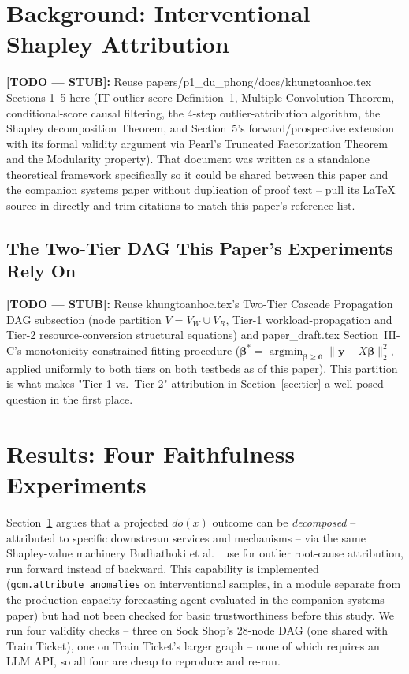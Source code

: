 \documentclass[journal, 10pt]{IEEEtran}
\begin{document}
\section{Background: Interventional Shapley Attribution}
\label{sec:background}
\textbf{[TODO --- STUB]:} Reuse papers/p1_du_phong/docs/khungtoanhoc.tex Sections 1--5 here (IT outlier score
Definition~1, Multiple Convolution Theorem, conditional-score causal
filtering, the 4-step outlier-attribution algorithm, the Shapley
decomposition Theorem, and Section~5's forward/prospective extension with
its formal validity argument via Pearl's Truncated Factorization Theorem and
the Modularity property). That document was written as a standalone
theoretical framework specifically so it could be shared between this paper
and the companion systems paper without duplication of proof text -- pull
its LaTeX source in directly and trim citations to match this paper's
reference list.

\subsection{The Two-Tier DAG This Paper's Experiments Rely On}
\textbf{[TODO --- STUB]:} Reuse khungtoanhoc.tex's Two-Tier Cascade Propagation DAG subsection
(node partition $V = V_W \cup V_R$, Tier-1 workload-propagation and Tier-2
resource-conversion structural equations) and paper\_draft.tex
Section~III-C's monotonicity-constrained fitting procedure ($\boldsymbol\beta^*
= \operatorname*{argmin}_{\boldsymbol\beta\ge\mathbf 0}\lVert \mathbf y - X\boldsymbol\beta\rVert_2^2$,
applied uniformly to both tiers on both testbeds as of this paper). This
partition is what makes "Tier 1 vs.\ Tier 2" attribution in
Section~\ref{sec:tier} a well-posed question in the first place.

\section{Results: Four Faithfulness Experiments}
\label{sec:results}

Section~\ref{sec:background} argues that a projected $do(x)$ outcome can be \emph{decomposed} -- attributed to specific downstream services and mechanisms -- via the same Shapley-value machinery Budhathoki et al.\ \cite{budhathoki2022rootcause} use for outlier root-cause attribution, run forward instead of backward. This capability is implemented (\texttt{gcm.attribute\_anomalies} on interventional samples, in a module separate from the production capacity-forecasting agent evaluated in the companion systems paper) but had not been checked for basic trustworthiness before this study. We run four validity checks -- three on Sock Shop's 28-node DAG (one shared with Train Ticket), one on Train Ticket's larger graph -- none of which requires an LLM API, so all four are cheap to reproduce and re-run.
\end{document}
